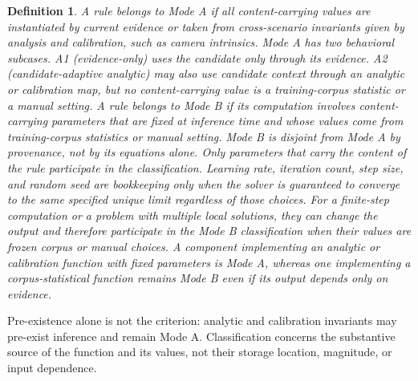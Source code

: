 \documentclass[twoside,11pt]{article}
\newtheorem{defn}{Definition}
\begin{document}
\begin{defn}
A rule belongs to \emph{Mode A} if all content-carrying values are instantiated by current evidence or taken from cross-scenario invariants given by analysis and calibration, such as camera intrinsics. Mode A has two behavioral subcases. \emph{A1 (evidence-only)} uses the candidate only through its evidence. \emph{A2 (candidate-adaptive analytic)} may also use candidate context through an analytic or calibration map, but no content-carrying value is a training-corpus statistic or a manual setting. A rule belongs to \emph{Mode B} if its computation involves content-carrying parameters that are fixed at inference time and whose values come from training-corpus statistics or manual setting. Mode B is disjoint from Mode A by provenance, not by its equations alone. Only parameters that carry the content of the rule participate in the classification. Learning rate, iteration count, step size, and random seed are bookkeeping only when the solver is guaranteed to converge to the same specified unique limit regardless of those choices. For a finite-step computation or a problem with multiple local solutions, they can change the output and therefore participate in the Mode B classification when their values are frozen corpus or manual choices. A component implementing an analytic or calibration function with fixed parameters is Mode A, whereas one implementing a corpus-statistical function remains Mode B even if its output depends only on evidence.
\end{defn}

Pre-existence alone is not the criterion: analytic and calibration invariants may pre-exist inference and remain Mode A. Classification concerns the substantive source of the function and its values, not their storage location, magnitude, or input dependence.
\end{document}
